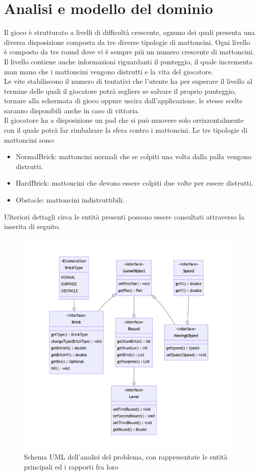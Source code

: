 \documentclass[a4paper,12pt]{report}
\begin{document}
\section{Analisi e modello del dominio}
Il gioco è strutturato a livelli di difficoltà crescente, ognuno dei quali presenta una diversa disposizione composta da tre diverse tipologie di mattoncini. Ogni livello è composto da tre round dove vi è sempre più un numero crescente di mattoncini.
Il livello contiene anche informazioni riguardanti il punteggio, il quale incrementa man mano che i mattoncini vengono distrutti e la vita del giocatore.
\\Le vite stabiliscono il numero di tentativi che l'utente ha per superare il livello al termine delle quali il giocatore potrà segliere se salvare il proprio punteggio, tornare alla schermata di gioco oppure uscira dall'applicazione, le stesse scelte saranno disponibili anche in caso di vittoria.
\\Il giocatore ha a disposizione un pad che si può muovere solo orrizzontalmente con il quale potrà far rimbalzare la sfera contro i mattoncini.
Le tre tipologie di mattoncini sono:
\begin{itemize}
    \item NormalBrick: mattoncini normali che se colpiti una volta dalla palla vengono distrutti.
    \item HardBrick: mattoncini che devono essere colpiti due volte per essere distrutti.
    \item Obstacle: mattoncini indistruttibili.
\end{itemize}
Ulteriori dettagli circa le entità presenti possono essere consultati attraverso la  inserita di seguito.
\begin{figure}[H]
    \centering{}
    \includegraphics{images/analysis.png}
    \caption{Schema UML dell'analisi del problema, con rappresentate le entità principali ed i rapporti fra loro}
    \label{images:analysis}
\end{figure}
\end{document}
